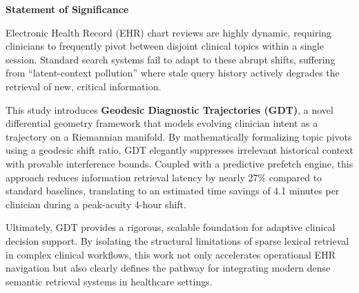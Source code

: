 \documentclass[11pt]{article}
\begin{document}
\begin{center}
    \Large\textbf{Statement of Significance}
\end{center}
\vspace{1em}

Electronic Health Record (EHR) chart reviews are highly dynamic, requiring clinicians to frequently pivot between disjoint clinical topics within a single session. Standard search systems fail to adapt to these abrupt shifts, suffering from ``latent-context pollution'' where stale query history actively degrades the retrieval of new, critical information. 

This study introduces \textbf{Geodesic Diagnostic Trajectories (GDT)}, a novel differential geometry framework that models evolving clinician intent as a trajectory on a Riemannian manifold. By mathematically formalizing topic pivots using a geodesic shift ratio, GDT elegantly suppresses irrelevant historical context with provable interference bounds. Coupled with a predictive prefetch engine, this approach reduces information retrieval latency by nearly 27\% compared to standard baselines, translating to an estimated time savings of 4.1 minutes per clinician during a peak-acuity 4-hour shift. 

Ultimately, GDT provides a rigorous, scalable foundation for adaptive clinical decision support. By isolating the structural limitations of sparse lexical retrieval in complex clinical workflows, this work not only accelerates operational EHR navigation but also clearly defines the pathway for integrating modern dense semantic retrieval systems in healthcare settings.
\end{document}
